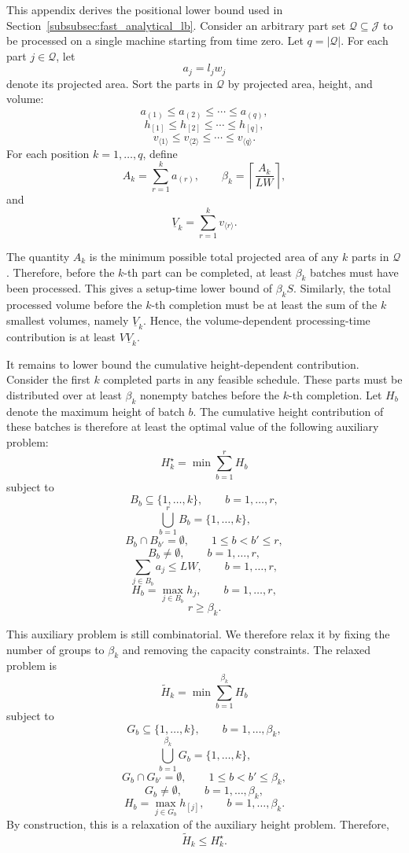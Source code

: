 \documentclass[letterpaper, 10 pt, conference]{ieeeconf}  %
\begin{document}
This appendix derives the positional lower bound used in
Section~\ref{subsubsec:fast_analytical_lb}. Consider an arbitrary part set
$\mathcal{Q}\subseteq\mathcal{J}$ to be processed on a single machine
starting from time zero. Let $q=|\mathcal{Q}|$. For each part
$j\in\mathcal{Q}$, let
\[
a_j=l_jw_j
\]
denote its projected area. Sort the parts in $\mathcal{Q}$ by projected
area, height, and volume:
\[
a_{(1)} \le a_{(2)} \le \cdots \le a_{(q)},
\]
\[
h_{[1]} \le h_{[2]} \le \cdots \le h_{[q]},
\]
\[
v_{\langle 1\rangle} \le v_{\langle 2\rangle}
\le \cdots \le v_{\langle q\rangle}.
\]
For each position $k=1,\dots,q$, define
\[
A_k=\sum_{r=1}^{k}a_{(r)},
\qquad
\beta_k=\left\lceil\frac{A_k}{LW}\right\rceil,
\]
and
\[
\underline{V}_k=\sum_{r=1}^{k}v_{\langle r\rangle}.
\]

The quantity $A_k$ is the minimum possible total projected area of any
$k$ parts in $\mathcal{Q}$. Therefore, before the $k$-th part can be
completed, at least $\beta_k$ batches must have been processed. This gives
a setup-time lower bound of $\beta_k S$. Similarly, the total processed
volume before the $k$-th completion must be at least the sum of the
$k$ smallest volumes, namely $\underline{V}_k$. Hence, the volume-dependent
processing-time contribution is at least $V\underline{V}_k$.

It remains to lower bound the cumulative height-dependent contribution.
Consider the first $k$ completed parts in any feasible schedule. These
parts must be distributed over at least $\beta_k$ nonempty batches before
the $k$-th completion. Let $H_b$ denote the maximum height of batch $b$.
The cumulative height contribution of these batches is therefore at least
the optimal value of the following auxiliary problem:
\[
H_k^{\star}
=
\min
\sum_{b=1}^{r}H_b
\]
subject to
\[
B_b\subseteq\{1,\dots,k\},\qquad b=1,\dots,r,
\]
\[
\bigcup_{b=1}^{r}B_b=\{1,\dots,k\},
\]
\[
B_b\cap B_{b'}=\emptyset,\qquad 1\le b<b'\le r,
\]
\[
B_b\neq\emptyset,\qquad b=1,\dots,r,
\]
\[
\sum_{j\in B_b}a_j\le LW,\qquad b=1,\dots,r,
\]
\[
H_b=\max_{j\in B_b}h_j,\qquad b=1,\dots,r,
\]
\[
r\ge \beta_k.
\]

This auxiliary problem is still combinatorial. We therefore relax it by
fixing the number of groups to $\beta_k$ and removing the capacity
constraints. The relaxed problem is
\[
\widetilde{H}_k
=
\min
\sum_{b=1}^{\beta_k}H_b
\]
subject to
\[
G_b\subseteq\{1,\dots,k\},\qquad b=1,\dots,\beta_k,
\]
\[
\bigcup_{b=1}^{\beta_k}G_b=\{1,\dots,k\},
\]
\[
G_b\cap G_{b'}=\emptyset,\qquad 1\le b<b'\le \beta_k,
\]
\[
G_b\neq\emptyset,\qquad b=1,\dots,\beta_k,
\]
\[
H_b=\max_{j\in G_b}h_{[j]},\qquad b=1,\dots,\beta_k.
\]
By construction, this is a relaxation of the auxiliary height problem.
Therefore,
\[
\widetilde{H}_k\le H_k^{\star}.
\]
\end{document}
